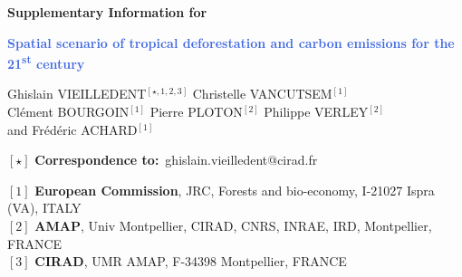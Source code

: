 
\begin{center}
  \Large{\textbf{Supplementary Information for}}
\end{center}

\vspace{1cm}

\begin{center}
  \LARGE{\textbf{\textcolor{RoyalBlue}{Spatial scenario of tropical deforestation and carbon emissions for the 21\textsuperscript{st} century}}}
\end{center}

\vspace{1cm}

\begin{center}
  \large{
  Ghislain VIEILLEDENT$^{[\star, 1, 2, 3]}$ \hspace{0.5cm} Christelle VANCUTSEM$^{[1]}$\\
  \vspace{0.5cm}
  Clément BOURGOIN$^{[1]}$ \hspace{0.5cm} Pierre PLOTON$^{[2]}$ \hspace{0.5cm} Philippe VERLEY$^{[2]}$\\
  \vspace{0.5cm}
  and \hspace{0.5cm} Frédéric ACHARD$^{[1]}$
  }
\end{center}

\vspace{0.5cm}

\begin{center}
  $[\star]$ \textbf{Correspondence to:}~ghislain.vieilledent@cirad.fr\\
\end{center}

\vspace{0.5cm}

{\small
  \begin{flushleft}
    $[1]$ \textbf{European Commission}, JRC, Forests and bio-economy, I-21027 Ispra (VA), ITALY\\
    $[2]$ \textbf{AMAP}, Univ Montpellier, CIRAD, CNRS, INRAE, IRD, Montpellier, FRANCE\\
    $[3]$ \textbf{CIRAD}, UMR AMAP, F-34398 Montpellier, FRANCE\\
  \end{flushleft}}


